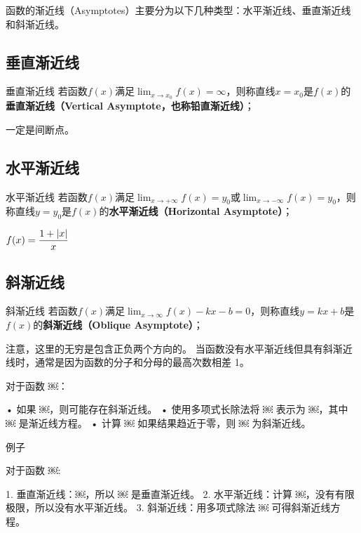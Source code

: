 
函数的渐近线（Asymptotes）主要分为以下几种类型：水平渐近线、垂直渐近线和斜渐近线。



\subsection{垂直渐近线}

\begin{definition}{垂直渐近线}
若函数$f(x)$满足$\displaystyle \lim_{x\to x_0}f(x)=\infty$，则称直线$x=x_0$是$f(x)$的\textbf{垂直渐近线（Vertical Asymptote，也称铅直渐近线）}；
\end{definition}
一定是间断点。

\subsection{水平渐近线}

\begin{definition}{水平渐近线}
若函数$f(x)$满足$\displaystyle \lim_{x\to +\infty}f(x)=y_0$或$\displaystyle \lim_{x\to -\infty}f(x)=y_0$，则称直线$y=y_0$是$f(x)$的\textbf{水平渐近线（Horizontal Asymptote）}；
\end{definition}


$\displaystyle f(x)={1+|x|\over x}$

\subsection{斜渐近线}

\begin{definition}{斜渐近线}
若函数$f(x)$满足$\displaystyle \lim_{x\to \infty}f(x)-kx-b=0$，则称直线$y=kx+b$是$f(x)$的\textbf{斜渐近线（Oblique Asymptote）}；
\end{definition}
注意，这里的无穷是包含正负两个方向的。
当函数没有水平渐近线但具有斜渐近线时，通常是因为函数的分子和分母的最高次数相差 1。

对于函数 ￼：

	•	如果 ￼，则可能存在斜渐近线。
	•	使用多项式长除法将 ￼ 表示为 ￼，其中 ￼ 是渐近线方程。
	•	计算 ￼ 如果结果趋近于零，则 ￼ 为斜渐近线。

例子

对于函数 ￼:

	1.	垂直渐近线：￼，所以 ￼ 是垂直渐近线。
	2.	水平渐近线：计算 ￼，没有有限极限，所以没有水平渐近线。
	3.	斜渐近线：用多项式除法 ￼ 可得斜渐近线方程。


